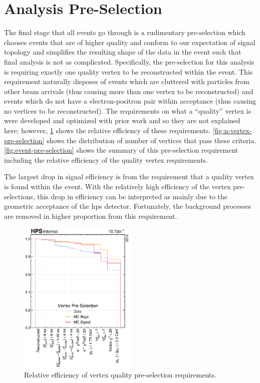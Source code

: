\section{Analysis Pre-Selection}
The final stage that all events go through is a rudimentary pre-selection which chooses events
that are of higher quality and conform to our expectation of signal topology and simplifies the
resulting shape of the data in the event such that final analysis is not as complicated.
Specifically, the pre-selection for this analysis is requiring exactly one quality vertex to be
reconstructed within the event.
This requirement naturally disposes of events which are cluttered with particles from other beam arrivals
(thus causing more than one vertex to be reconstructed) and
events which do not have a electron-positron pair within acceptance (thus causing no vertices to be
reconstructed).
The requirements on what a ``quality'' vertex is were developed and optimized with
prior work and so they are not explained here; however,
\cref{fig:vertex-pre-selection} shows the relative efficiency of these requirements.
\cref{fig:n-vertex-pre-selection} shows the distribution of number of vertices
that pass these criteria.
\cref{fig:event-pre-selection} shows the summary of this pre-selection requirement including the relative
efficiency of the quality vertex requirements.

The largest drop in signal efficiency is from the requirement that a quality vertex is found
within the event.
With the relatively high efficiency of the vertex pre-selections, this drop in efficiency
can be interpreted as mainly due to the geometric acceptance of the \ac{hps} detector.
Fortunately, the background processes are removed in higher proportion from this requirement.

\begin{figure}
  \centering
  \includegraphics[width=0.5\textwidth]{figures/hps/dataset/vertex-pre-selection-efficiency.pdf}
  \caption{Relative efficiency of vertex quality pre-selection requirements.}
  \label{fig:vertex-pre-selection}
\end{figure}

